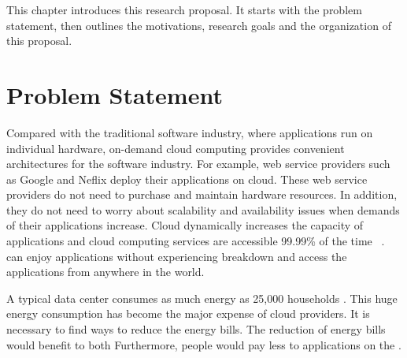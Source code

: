 This chapter introduces this research proposal. It starts with the problem statement, then outlines the motivations, research goals and the organization of this proposal.

\section{Problem Statement}
\label{sec:statement}
 Compared with the traditional software industry, where applications run
on individual hardware, on-demand cloud computing provides convenient architectures for the software industry. For example, 
web service providers such as Google and Neflix deploy their applications on cloud. These web service providers 
do not need to purchase and maintain hardware resources. 
In addition, they do not need to worry 
about scalability and availability issues when demands of their applications increase. Cloud dynamically increases the capacity of applications and cloud computing services are accessible 99.99\% of the time ~\cite{adhikari:2012uq}.
 can enjoy applications without experiencing breakdown and access the applications from anywhere in the world.

A typical data center consumes as much energy as 25,000 households \cite{dayarathna:2016ua}. 
This huge energy consumption has become the major expense of cloud providers. It is necessary to find ways to reduce the energy bills. 
The reduction of energy bills would benefit to both  
Furthermore, people would pay less to applications on the . 

